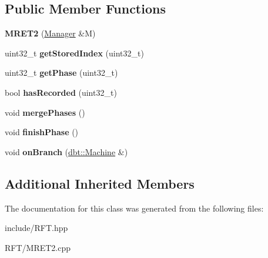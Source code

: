\subsection*{Public Member Functions}
\begin{DoxyCompactItemize}
\item 
{\bfseries M\+R\+E\+T2} (\hyperlink{classdbt_1_1_manager}{Manager} \&M)\hypertarget{classdbt_1_1_m_r_e_t2_ace66a9d7ea87615214d90789a8f36f74}{}\label{classdbt_1_1_m_r_e_t2_ace66a9d7ea87615214d90789a8f36f74}

\item 
uint32\+\_\+t {\bfseries get\+Stored\+Index} (uint32\+\_\+t)\hypertarget{classdbt_1_1_m_r_e_t2_ac890ad4aa8ee7e3557c9602be26655c3}{}\label{classdbt_1_1_m_r_e_t2_ac890ad4aa8ee7e3557c9602be26655c3}

\item 
uint32\+\_\+t {\bfseries get\+Phase} (uint32\+\_\+t)\hypertarget{classdbt_1_1_m_r_e_t2_aaae954760928fcb64fd95cd58ef27db0}{}\label{classdbt_1_1_m_r_e_t2_aaae954760928fcb64fd95cd58ef27db0}

\item 
bool {\bfseries has\+Recorded} (uint32\+\_\+t)\hypertarget{classdbt_1_1_m_r_e_t2_a41d151d858fe79aa9eda01f241b1a75b}{}\label{classdbt_1_1_m_r_e_t2_a41d151d858fe79aa9eda01f241b1a75b}

\item 
void {\bfseries merge\+Phases} ()\hypertarget{classdbt_1_1_m_r_e_t2_a9a3a415d428749d0546aa43659314857}{}\label{classdbt_1_1_m_r_e_t2_a9a3a415d428749d0546aa43659314857}

\item 
void {\bfseries finish\+Phase} ()\hypertarget{classdbt_1_1_m_r_e_t2_abfad6112fef002b10a5106a66bde4773}{}\label{classdbt_1_1_m_r_e_t2_abfad6112fef002b10a5106a66bde4773}

\item 
void {\bfseries on\+Branch} (\hyperlink{classdbt_1_1_machine}{dbt\+::\+Machine} \&)\hypertarget{classdbt_1_1_m_r_e_t2_aa37c1ab3c69239cdde39c9cd39dd90ae}{}\label{classdbt_1_1_m_r_e_t2_aa37c1ab3c69239cdde39c9cd39dd90ae}

\end{DoxyCompactItemize}
\subsection*{Additional Inherited Members}


The documentation for this class was generated from the following files\+:\begin{DoxyCompactItemize}
\item 
include/R\+F\+T.\+hpp\item 
R\+F\+T/M\+R\+E\+T2.\+cpp\end{DoxyCompactItemize}
